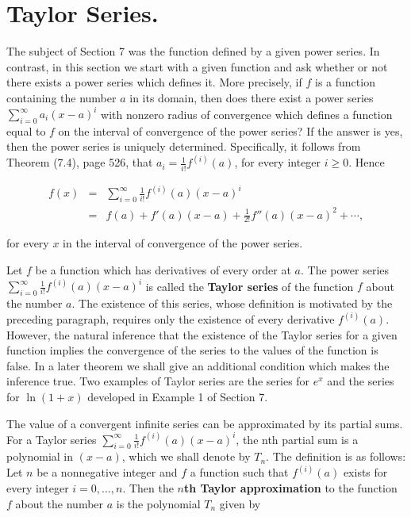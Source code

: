 \section{Taylor Series.} 
The subject of Section 7 was the function defined by a given power series. In contrast, in this section we start with a given function and ask whether or not there exists a power series which defines it. More precisely, if $f$ is a function containing the number $a$ in its domain, then does there exist a power series $\sum_{i=0}^\infty a_i (x - a)^i$ with nonzero radius of convergence which defines a function equal to $f$ on the interval of convergence of the power series? If the answer is yes, then the power series is uniquely determined. Specifically, it follows from Theorem (7.4), page 526, that $a_i = \frac{1}{i!} f^{(i)}(a)$, for every integer $i \geq 0$. Hence

\begin{eqnarray*}
f(x) &=& \sum_{i=0}^\infty \frac{1}{i!} f^{(i)}(a)(x - a)^i \\
      &=& f(a) + f'(a)(x - a) + \frac{1}{2!} f''(a)(x - a)^2 + \cdots,
\end{eqnarray*}

\noindent for every $x$ in the interval of convergence of the power series.

Let $f$ be a function which has derivatives of every order at $a$. The power series $\sum_{i=0}^\infty \frac{1}{i!} f^{(i)}(a)(x - a)^i$ is called the \textbf{Taylor series} of the function $f$ about the number $a$. The existence of this series, whose definition is motivated by the preceding paragraph, requires only the existence of every derivative $f^{(i)}(a)$. However, the natural inference that the existence of the Taylor series for a given function implies the convergence of the series to the values of the function is false. In a later theorem we shall give an additional condition which makes the inference true. Two examples of Taylor series are the
series for $e^x$ and the series for $\ln(1 + x)$ developed in Example 1 of Section 7.

The value of a convergent infinite series can be approximated by its partial sums. For a Taylor series $\sum_{i=0}^\infty \frac{1}{i!} f^{(i)}(a)(x-a)^i$, the nth partial sum is a polynomial in $(x-a)$, which we shall denote by $T_n$. The definition is as follows: Let $n$ be a nonnegative integer and $f$ a function such that $f^{(i)}(a)$ exists for every integer $i = 0, . . ., n$. Then the $n$\textbf{th Taylor approximation} to the function $f$ about the number $a$ is the polynomial $T_n$ given by

